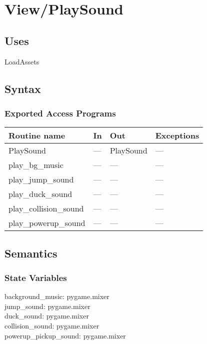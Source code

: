 \documentclass[12pt]{article}
\begin{document}
\newpage
\section*{View/PlaySound}

\subsection* {Uses}
LoadAssets
\subsection* {Syntax}

\subsubsection* {Exported Access Programs}

\begin{tabular}{| l | l | l | l |}
\hline
\textbf{Routine name} & \textbf{In} & \textbf{Out} & \textbf{Exceptions}\\
\hline
    PlaySound & --- & PlaySound & ---\\
\hline
    play\_bg\_music & --- & --- & ---\\
\hline
    play\_jump\_sound & --- & --- & ---\\
\hline
    play\_duck\_sound & --- & --- & ---\\
\hline
    play\_collision\_sound & --- & --- & ---\\
\hline
    play\_powerup\_sound & --- & --- & --- \\
\hline
\end{tabular}

\subsection* {Semantics}

\subsubsection* {State Variables}

background\_music: pygame.mixer\\
jump\_sound: pygame.mixer\\
duck\_sound: pygame.mixer\\
collision\_sound: pygame.mixer\\
powerup\_pickup\_sound: pygame.mixer 
\end{document}

